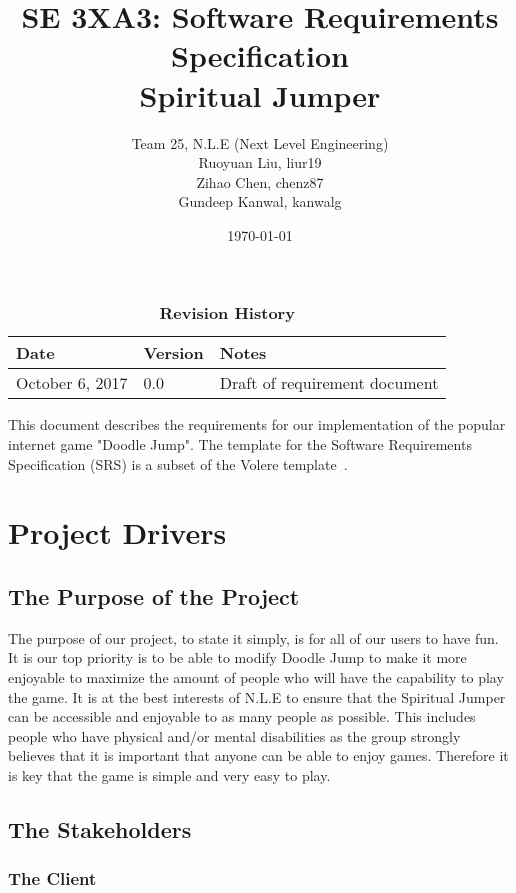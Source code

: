 \documentclass[12pt, titlepage]{article}
\title{SE 3XA3: Software Requirements Specification\\Spiritual Jumper}
\author{Team 25, N.L.E (Next Level Engineering)
		\\ Ruoyuan Liu, liur19
		\\ Zihao Chen, chenz87
		\\ Gundeep Kanwal, kanwalg
}
\date{\today}
\begin{document}
\maketitle

\tableofcontents
\listoftables
\listoffigures

\begin{table}[bp]
\caption{\bf Revision History}
\begin{tabularx}{\textwidth}{p{3cm}p{2cm}X}
\toprule {\bf Date} & {\bf Version} & {\bf Notes}\\
\midrule
October 6, 2017 & 0.0 & Draft of requirement document\\
\bottomrule
\end{tabularx}
\end{table}

\newpage


This document describes the requirements for our implementation of the popular internet game "Doodle Jump". The template for the Software
Requirements Specification (SRS) is a subset of the Volere
template~\citep{RobertsonAndRobertson2012}.

\section{Project Drivers}

\subsection{The Purpose of the Project}

The purpose of our project, to state it simply, is for all of our users to have fun. It is our top priority is to be able to modify Doodle Jump to make it more enjoyable to maximize the amount of people who will have the capability to play the game. It is at the best interests of N.L.E to ensure that the Spiritual Jumper can be accessible and enjoyable to as many people as possible. This includes people who have physical and/or mental disabilities as the group strongly believes that it is important that anyone can be able to enjoy games. Therefore it is key that the game is simple and very easy to play.

\subsection{The Stakeholders}

\subsubsection{The Client}
\end{document}
